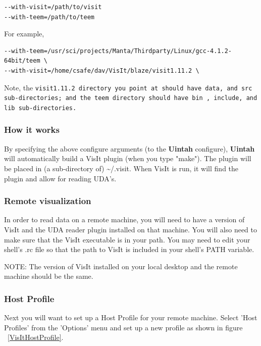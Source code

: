 \documentclass[12pt]{article}
\begin{document}
\begin{verbatim}
--with-visit=/path/to/visit 
--with-teem=/path/to/teem
\end{verbatim}

For example,

\begin{verbatim}
--with-teem=/usr/sci/projects/Manta/Thirdparty/Linux/gcc-4.1.2-64bit/teem \
--with-visit=/home/csafe/dav/VisIt/blaze/visit1.11.2 \
\end{verbatim}

Note, the \tt visit1.11.2 \normalfont directory you point at should
have \tt data\normalfont , and \tt src \normalfont sub-directories;
and the \tt teem \normalfont directory should have \tt bin\normalfont
, \tt include\normalfont , and \tt lib \normalfont sub-directories.

\subsubsection{How it works}
By specifying the above configure arguments (to the \textbf{Uintah}
configure), \textbf{Uintah} will automatically build a VisIt plugin
(when you type "make"). The plugin will be placed in (a sub-directory
of) \textasciitilde/.visit. When VisIt is run, it will find the plugin and allow for
reading UDA's.

\subsubsection{Remote visualization}
In order to read data on a remote machine, you will need to have a
version of VisIt and the UDA reader plugin installed on that
machine. You will also need to make sure that the VisIt executable is
in your path. You may need to edit your shell's .rc file so that the
path to VisIt is included in your shell's PATH variable.

NOTE: The version of VisIt installed on your local desktop and the
remote machine should be the same.

\subsubsection{Host Profile}
Next you will want to set up a Host Profile for your remote
machine. Select 'Host Profiles' from the 'Options' menu and set up a
new profile as shown in figure ~\ref{VisItHostProfile}.
\end{document}
